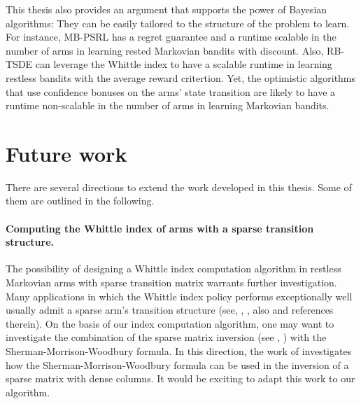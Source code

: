 This thesis also provides an argument that supports the power of Bayesian algorithms: They can be easily tailored to the structure of the problem to learn.
For instance, MB-PSRL has a regret guarantee and a runtime scalable in the number of arms in learning rested Markovian bandits with discount.
Also, RB-TSDE \cite{akbarzadeh2022learning} can leverage the Whittle index to have a scalable runtime in learning restless bandits with the average reward critertion.
Yet, the optimistic algorithms that use confidence bonuses on the arms' state transition are likely to have a runtime non-scalable in the number of arms in learning Markovian bandits.


\section{Future work}

There are several directions to extend the work developed in this thesis. Some of them are outlined in the following.

\paragraph{Computing the Whittle index of arms with a sparse transition structure.}
The possibility of designing a Whittle index computation algorithm in restless Markovian arms with sparse transition matrix warrants further investigation.
Many applications in which the Whittle index policy performs exceptionally well usually admit a sparse arm's transition structure (see, \eg, \cite{wang1995finite, nino2002dynamic, aalto2018whittle}, also \cite{wang2020restless} and references therein).
On the basis of our index computation algorithm, one may want to investigate the combination of the sparse matrix inversion (see \eg, \cite{dulmage1962inversion, niessner1983computing}) with the Sherman-Morrison-Woodbury formula.
In this direction, the work of \cite{vanderbei1991splitting} investigates how the Sherman-Morrison-Woodbury formula can be used in the inversion of a sparse matrix with dense columns.
It would be exciting to adapt this work to our algorithm.


